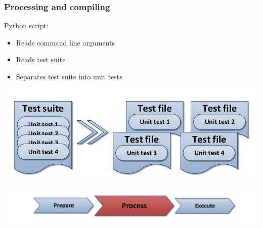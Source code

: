 \documentclass[british,10pt]{beamer}
\begin{document}
\begin{frame}\frametitle{Processing and compiling}
\vskip20pt
Python script:
\begin{itemize}
\item Reads command line arguments
\item Reads test suite
\item Separates test suite into unit tests
\end{itemize}
\vskip5pt
\centering
\includegraphics[width=.8\textwidth]{images/tbsplit.pdf}
\vskip20pt
\includegraphics[width=.7\textwidth]{images/ppe2.pdf}
\end{frame}



\end{document}
